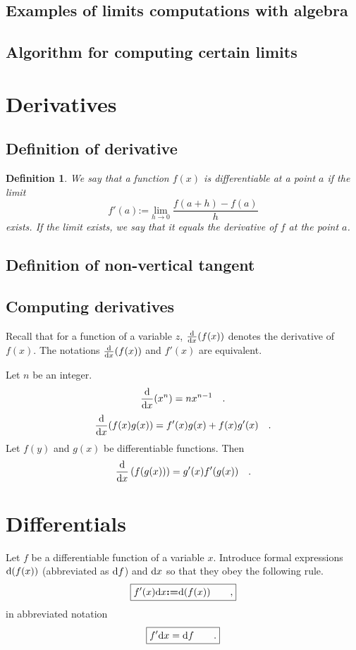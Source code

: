 \documentclass[12pt]{book}
\newcommand{\eqdef}{\textbf{:=}}
\newtheorem{definition}[theorem]{Definition}
\begin{document}
\subsection{Examples of limits computations with algebra}



\subsection{Algorithm for computing certain limits}


\section{Derivatives}

\subsection{Definition of derivative}\label{secDerivative}
\begin{definition}
We say that a function $f(x)$ is differentiable at a point $a$ if the limit
\begin{equation}\label{eqDefDerivative}
f'(a)\eqdef \lim_{h\to 0} \frac{f(a+h)-f(a)}{h}
\end{equation}
exists. If the limit exists, we say that it equals the derivative of $f$ at the point $a$.
\end{definition}

\subsection{Definition of non-vertical tangent}
\label{secDefTangent}

\subsection{Computing derivatives}
Recall that for a function of a variable $z$, $\frac{{\normalfont \text{d}} }{{\normalfont \text{d}} x}(f(x))$ denotes the derivative of $f(x)$. The notations $\frac{{\normalfont \text{d}} }{{\normalfont \text{d}} x}(f(x))$ and $f'(x)$ are equivalent.

Let $n$ be an integer.
\[
\frac{{\normalfont \text{d}} }{{\normalfont \text{d}} x} (x^n)= n x^{n-1}\quad .
\]
\[
\frac{{\normalfont \text{d}} }{{\normalfont \text{d}} x} (f(x)g(x)) = f'(x)g(x)+f(x)g'(x) \quad .
\]
Let $f(y)$ and $g(x)$ be differentiable functions.  Then
\[
\frac{{\normalfont \text{d}} }{{\normalfont \text{d}} x} \left(f( g(x))\right)= g'(x) f'(g(x)) \quad .
\]




\section{Differentials}
Let $f$ be a differentiable function of a variable $x$. Introduce formal expressions ${\normalfont \text{d}}(f(x))$ (abbreviated as ${\normalfont \text{d}} f$) and ${\normalfont \text{d}} x$ so that they obey the following rule.
\begin{equation}\boxed{
f'(x)\diff x\eqdef \diff(f(x))\quad \quad,
}
\end{equation}
in abbreviated notation
\begin{equation}\boxed{
f'{\normalfont \text{d}} x = {\normalfont \text{d}} f\quad \quad .
}
\end{equation}
\end{document}
